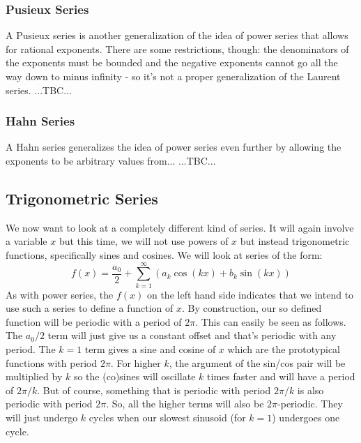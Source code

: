 \subsubsection{Pusieux Series}
A Pusieux series is another generalization of the idea of power series that allows for rational exponents. There are some restrictions, though: the denominators of the exponents must be bounded and the negative exponents cannot go all the way down to minus infinity - so it's not a proper generalization of the Laurent series. ...TBC...



\subsubsection{Hahn Series}
A Hahn series generalizes the idea of power series even further by allowing the exponents to be arbitrary values from... ...TBC...




\subsection{Trigonometric Series}
We now want to look at a completely different kind of series. It will again involve a variable $x$ but this time, we will not use powers of $x$ but instead trigonometric functions, specifically sines and cosines. We will look at series of the form:
\begin{equation}
\label{Eq:FourierSeries}
 f(x) = \frac{a_0}{2} + \sum_{k=1}^\infty \left(  a_k \cos(k x) + b_k \sin(k x) \right)
\end{equation}
As with power series, the $f(x)$ on the left hand side indicates that we intend to use such a series to define a function of $x$. By construction, our so defined function will be periodic with a period of $2\pi$. This can easily be seen as follows. The $a_0/2$ term will just give us a constant offset and that's periodic with any period. The $k=1$ term gives a sine and cosine of $x$ which are the prototypical functions with period $2\pi$. For higher $k$, the argument of the sin/cos pair will be multiplied by $k$ so the (co)sines will oscillate $k$ times faster and will have a period of $2\pi/k$. But of course, something that is periodic with period $2\pi/k$ is also periodic with period $2\pi$. So, all the higher terms will also be $2\pi$-periodic. They will just undergo $k$ cycles when our slowest sinusoid (for $k=1$) undergoes one cycle.

